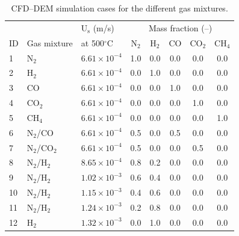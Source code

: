 \documentclass{article}
\begin{document}

\begin{table}[H]
    \centering
    \caption{CFD--DEM simulation cases for the different gas mixtures.}
    \begin{tabular}{lllccccc}
        \toprule
           &               & U$_\text{s}$ (m/s)  &\multicolumn{5}{c}{Mass fraction (--)}  \\
        ID & Gas mixture   & at 500$^\circ$C     & N$_2$ & H$_2$ & CO  & CO$_2$ & CH$_4$  \\
        \midrule
        1  & N$_2$         & $6.61\times10^{-4}$ & 1.0   & 0.0   & 0.0 & 0.0    & 0.0     \\
        2  & H$_2$         & $6.61\times10^{-4}$ & 0.0   & 1.0   & 0.0 & 0.0    & 0.0     \\
        3  & CO            & $6.61\times10^{-4}$ & 0.0   & 0.0   & 1.0 & 0.0    & 0.0     \\
        4  & CO$_2$        & $6.61\times10^{-4}$ & 0.0   & 0.0   & 0.0 & 1.0    & 0.0     \\
        5  & CH$_4$        & $6.61\times10^{-4}$ & 0.0   & 0.0   & 0.0 & 0.0    & 1.0     \\
        6  & N$_2$/CO      & $6.61\times10^{-4}$ & 0.5   & 0.0   & 0.5 & 0.0    & 0.0     \\
        7  & N$_2$/CO$_2$  & $6.61\times10^{-4}$ & 0.5   & 0.0   & 0.0 & 0.5    & 0.0     \\
        8  & N$_2$/H$_2$   & $8.65\times10^{-4}$ & 0.8   & 0.2   & 0.0 & 0.0    & 0.0     \\
        9  & N$_2$/H$_2$   & $1.02\times10^{-3}$ & 0.6   & 0.4   & 0.0 & 0.0    & 0.0     \\
        10 & N$_2$/H$_2$   & $1.15\times10^{-3}$ & 0.4   & 0.6   & 0.0 & 0.0    & 0.0     \\
        11 & N$_2$/H$_2$   & $1.24\times10^{-3}$ & 0.2   & 0.8   & 0.0 & 0.0    & 0.0     \\
        12 & H$_2$         & $1.32\times10^{-3}$ & 0.0   & 1.0   & 0.0 & 0.0    & 0.0     \\
        \bottomrule
    \end{tabular}
    \label{tab:flowrates}
\end{table}

\end{document}
